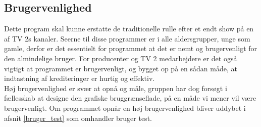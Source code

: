 \subsection{Brugervenlighed}
Dette program skal kunne erstatte de traditionelle rulle efter et endt show på en af TV 2s kanaler. Seerne til disse programmer er i alle aldersgrupper, unge som gamle, derfor er det essentielt for programmet at det er nemt og brugervenligt for den almindelige bruger. For producenter og TV 2 medarbejdere er det også vigtigt at programmet er brugervenligt, og bygget op på en sådan måde, at indtastning af krediteringer er hurtig og effektiv. \\ Høj brugervenlighed er svær at opnå og måle, gruppen har dog forsøgt i fællesskab at designe den grafiske bruggrænseflade, på en måde vi mener vil være brugervenligt. Om programmet opnår en høj brugervenlighed bliver uddybet i afsnit \ref{bruger_test} som omhandler bruger test.